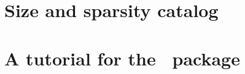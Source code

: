 \section{Size and sparsity catalog} \label{sec:instance_size_sparsity}


\section{A tutorial for the \julia\ package} \label{sec:tutorial}







